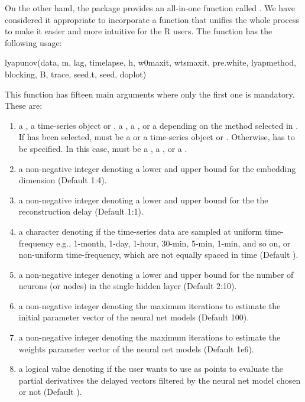 On the other hand, the  package provides an all-in-one function called . We have considered it appropriate to incorporate a function that unifies the whole process to make it easier and more intuitive for the R users. The  function has the following usage:

\begin{example}
lyapunov(data, m, lag, timelapse, h, w0maxit, wtsmaxit, pre.white, lyapmethod, 
 	blocking, B, trace, seed.t, seed, doplot)
\end{example}
This function has fifteen main arguments where only the first one is mandatory. These are:

\begin{enumerate}
\item[]  a , a time-series object  or , a , a , or a  depending on the method selected in . If  has been selected,  must be a  or a time-series object  or . Otherwise,  has to be specified. In this case,  must be a , a , or a .
\item[]  a non-negative integer denoting a lower and upper bound for the embedding dimension (Default 1:4).
\item[]  a non-negative integer denoting a lower and upper bound for the the reconstruction delay (Default 1:1).
\item[]  a character denoting if the time-series data are sampled at uniform time-frequency e.g., 1-month, 1-day, 1-hour, 30-min, 5-min, 1-min, and so on,  or non-uniform time-frequency, which are not equally spaced in time  (Default ).
\item[]  a non-negative integer denoting a lower and upper bound for the number of neurons (or nodes) in the single hidden layer (Default 2:10).
\item[]  a non-negative integer denoting the maximum iterations to estimate the initial parameter vector of the neural net models (Default 100).
\item[]  a non-negative integer denoting the maximum iterations to estimate the weights parameter vector of the neural net models (Default 1e6).
\item[]  a logical value denoting if the user wants to use as points to evaluate the partial derivatives the delayed vectors filtered by the neural net model chosen  or not  (Default ).

\end{enumerate}
